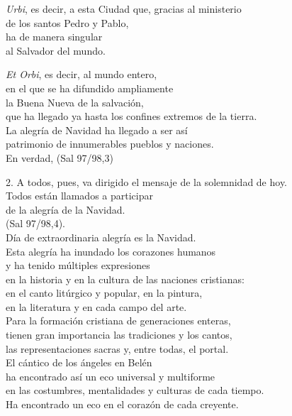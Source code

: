 \emph{Urbi}, es decir, a esta Ciudad que, gracias al ministerio\\ de los santos Pedro y Pablo,\\ ha  de manera singular\\ al Salvador del mundo.

\emph{Et Orbi}, es decir, al mundo entero,\\ en el que se ha difundido ampliamente\\ la Buena Nueva de la salvación,\\ que ha llegado ya hasta los confines extremos de la tierra.\\ La alegría de Navidad ha llegado a ser así\\ patrimonio de innumerables pueblos y naciones.\\ En verdad,  (Sal 97/98,3)

2. A todos, pues, va dirigido el mensaje de la solemnidad de hoy.\\ Todos están llamados a participar\\ de la alegría de la Navidad.\\  (Sal 97/98,4).\\ Día de extraordinaria alegría es la Navidad.\\ Esta alegría ha inundado los corazones humanos\\ y ha tenido múltiples expresiones\\ en la historia y en la cultura de las naciones cristianas:\\ en el canto litúrgico y popular, en la pintura,\\ en la literatura y en cada campo del arte.\\ Para la formación cristiana de generaciones enteras,\\ tienen gran importancia las tradiciones y los cantos,\\ las representaciones sacras y, entre todas, el portal.\\ El cántico de los ángeles en Belén\\ ha encontrado así un eco universal y multiforme\\ en las costumbres, mentalidades y culturas de cada tiempo.\\ Ha encontrado un eco en el corazón de cada creyente.

